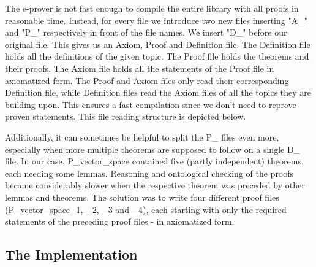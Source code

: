 \documentclass[11pt]{article}
\begin{document}
\newpage

The e-prover is not fast enough to compile the entire library with all proofs in reasonable time. 
Instead, for every file we introduce two new files inserting "A\_" and "P\_" respectively in front of the file names. We insert "D\_" before our original file. This gives us an Axiom, Proof and Definition file. 
The Definition file holds all the definitions of the given topic. 
The Proof file holds the theorems and their proofs. The Axiom file holds all the statements of the Proof file in axiomatized form. 
The Proof and Axiom files only read their corresponding Definition file, while Definition files read the Axiom files of all the topics they are building upon. 
This ensures a fast compilation since we don't need to reprove proven statements. 
This file reading structure is depicted below.

\begin{figure}[h]
\begin{center}
\end{center}
\end{figure}

Additionally, it can sometimes be helpful to split the P\_ files even more, especially when more multiple theorems are supposed to follow on a single D\_ file. In our case, P\_vector\_space contained five (partly independent) theorems, each needing some lemmas. Reasoning and ontological checking of the proofs became considerably slower when the respective theorem was preceded by other lemmas and theorems. The solution was to write four different proof files (P\_vector\_space\_1, \_2, \_3 and \_4), each starting with only the required statements of the preceding proof files - in axiomatized form.


\subsection{The Implementation}
\end{document}
